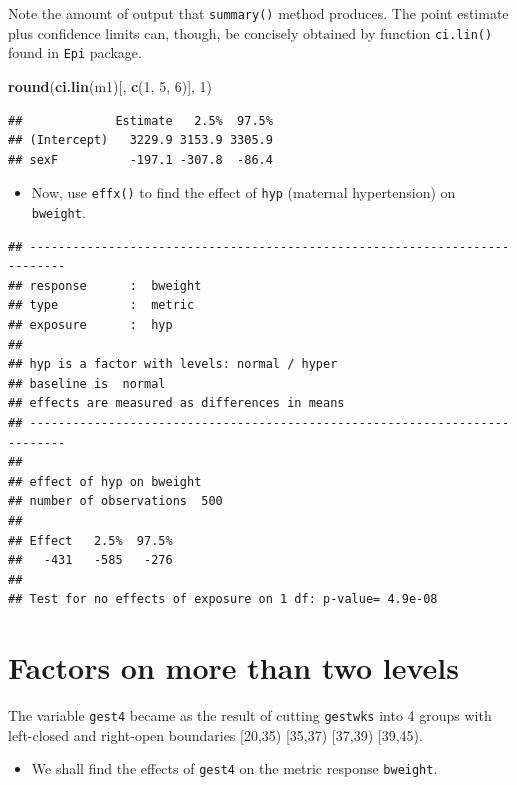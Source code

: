 \documentclass[
]{book}
\newenvironment{Shaded}{\begin{snugshade}}{\end{snugshade}}
\newcommand{\DecValTok}[1]{\textcolor[rgb]{0.00,0.00,0.81}{#1}}
\newcommand{\FunctionTok}[1]{\textcolor[rgb]{0.13,0.29,0.53}{\textbf{#1}}}
\newcommand{\NormalTok}[1]{#1}
\providecommand{\tightlist}{%
  \setlength{\itemsep}{0pt}\setlength{\parskip}{0pt}}
\begin{document}
Note the amount of output that \texttt{summary()} method produces.
The point estimate plus confidence limits can, though, be concisely obtained by function
\texttt{ci.lin()} found in \texttt{Epi} package.

\begin{Shaded}
\begin{Highlighting}[]
\FunctionTok{round}\NormalTok{(}\FunctionTok{ci.lin}\NormalTok{(m1)[, }\FunctionTok{c}\NormalTok{(}\DecValTok{1}\NormalTok{, }\DecValTok{5}\NormalTok{, }\DecValTok{6}\NormalTok{)], }\DecValTok{1}\NormalTok{)}
\end{Highlighting}
\end{Shaded}

\begin{verbatim}
##             Estimate   2.5%  97.5%
## (Intercept)   3229.9 3153.9 3305.9
## sexF          -197.1 -307.8  -86.4
\end{verbatim}

\begin{itemize}
\tightlist
\item
  Now, use \texttt{effx()} to find the effect of \texttt{hyp} (maternal hypertension)
  on \texttt{bweight}.
\end{itemize}

\begin{verbatim}
## --------------------------------------------------------------------------- 
## response      :  bweight 
## type          :  metric 
## exposure      :  hyp 
## 
## hyp is a factor with levels: normal / hyper 
## baseline is  normal 
## effects are measured as differences in means 
## --------------------------------------------------------------------------- 
## 
## effect of hyp on bweight 
## number of observations  500 
## 
## Effect   2.5%  97.5% 
##   -431   -585   -276 
## 
## Test for no effects of exposure on 1 df: p-value= 4.9e-08
\end{verbatim}

\section{Factors on more than two levels}\label{factors-on-more-than-two-levels}

The variable \texttt{gest4} became as the result of cutting \texttt{gestwks}
into 4 groups with left-closed and right-open boundaries {[}20,35) {[}35,37) {[}37,39) {[}39,45).

\begin{itemize}
\tightlist
\item
  We shall find the effects of \texttt{gest4} on the metric response \texttt{bweight}.
\end{itemize}
\end{document}
